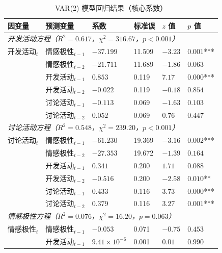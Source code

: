 \documentclass[
    type = master, %
    degree = professional,        %
    decl-page,  %
    twoside,                %
    fontset = fandol %
  ]{njuthesis}
\begin{document}
\begin{table}[htbp]
    \centering
    \caption{VAR(2) 模型回归结果（核心系数）}
    \label{tab:var-results}
    \small
    \begin{tabularx}{\textwidth}{p{3.2cm}p{3.2cm}XXXX}
        \toprule
        因变量 & 预测变量 & 系数 & 标准误 & $z$ 值 & $p$ 值 \\
        \midrule
        \multicolumn{6}{l}{\textit{开发活动方程（$R^2 = 0.617$，$\chi^2 = 316.67$，$p < 0.001$）}} \\[2pt]
        开发活动$_t$ & 情感极性$_{t-1}$ & $-37.199$ & 11.509 & $-3.23$ & $0.001$*** \\
                 & 情感极性$_{t-2}$ & $-21.711$ & 11.689 & $-1.86$ & $0.063$ \\
                 & 开发活动$_{t-1}$      & $0.853$   & 0.119  & $7.17$  & $0.000$*** \\
                 & 开发活动$_{t-2}$      & $-0.022$  & 0.119  & $-0.18$ & $0.854$ \\
                 & 讨论活动$_{t-1}$   & $-0.113$  & 0.069  & $-1.63$ & $0.103$ \\
                 & 讨论活动$_{t-2}$   & $0.052$   & 0.069  & $0.76$  & $0.447$ \\[6pt]
        \multicolumn{6}{l}{\textit{讨论活动方程（$R^2 = 0.548$，$\chi^2 = 239.20$，$p < 0.001$）}} \\[2pt]
        讨论活动$_t$ & 情感极性$_{t-1}$ & $-61.230$ & 19.369 & $-3.16$ & $0.002$*** \\
                    & 情感极性$_{t-2}$ & $-27.353$ & 19.672 & $-1.39$ & $0.164$ \\
                    & 开发活动$_{t-1}$      & $0.341$   & 0.200  & $1.71$  & $0.088$ \\
                    & 开发活动$_{t-2}$      & $-0.516$  & 0.200  & $-2.58$ & $0.010$** \\
                    & 讨论活动$_{t-1}$   & $0.433$   & 0.116  & $3.73$  & $0.000$*** \\
                    & 讨论活动$_{t-2}$   & $0.379$   & 0.116  & $3.27$  & $0.001$*** \\[6pt]
        \multicolumn{6}{l}{\textit{情感极性方程（$R^2 = 0.076$，$\chi^2 = 16.20$，$p = 0.063$）}} \\[2pt]
        情感极性$_t$ & 情感极性$_{t-1}$ & $-0.053$ & 0.071 & $-0.75$ & $0.453$ \\
                      & 开发活动$_{t-1}$      & $9.41\times10^{-6}$ & 0.001 & $0.01$ & $0.990$ \\

\end{tabularx}
\end{table}
\end{document}
